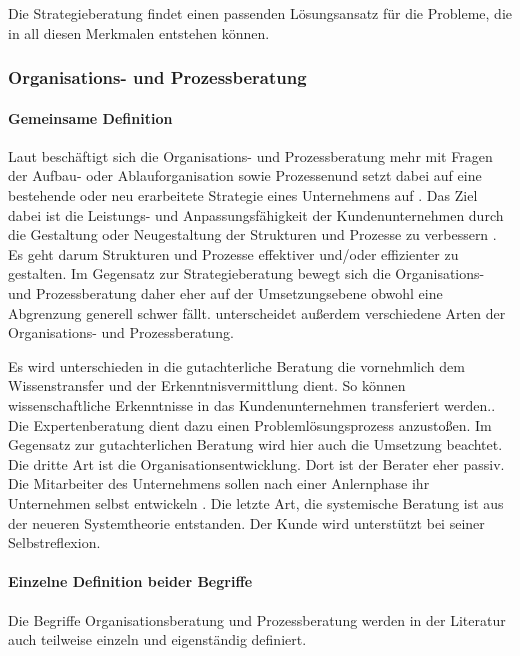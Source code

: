 Die Strategieberatung findet einen passenden Lösungsansatz für die Probleme, die in all diesen Merkmalen entstehen können.


\subsubsection*{Organisations- und Prozessberatung}

\paragraph*{Gemeinsame Definition}
Laut \cite[63]{Lippold201309} beschäftigt sich die Organisations- und Prozessberatung mehr \glqq mit Fragen der Aufbau- oder Ablauforganisation sowie Prozessen\grqq und setzt dabei auf eine \glqq bestehende oder neu erarbeitete Strategie eines Unternehmens auf \grqq. Das Ziel \glqq dabei ist die Leistungs- und Anpassungsfähigkeit der Kundenunternehmen durch die Gestaltung oder Neugestaltung der Strukturen und Prozesse zu verbessern \grqq. Es geht darum Strukturen und Prozesse \glqq effektiver und/oder effizienter \grqq zu gestalten. Im Gegensatz zur Strategieberatung bewegt sich die Organisations- und Prozessberatung daher eher auf der Umsetzungsebene obwohl eine Abgrenzung generell schwer fällt. \cite[63]{Lippold201309} unterscheidet außerdem verschiedene Arten der Organisations- und Prozessberatung.

Es wird unterschieden in die gutachterliche Beratung die \glqq vornehmlich dem Wissenstransfer und der Erkenntnisvermittlung \grqq dient. So können \glqq wissenschaftliche Erkenntnisse in das Kundenunternehmen transferiert werden.\grqq . Die Expertenberatung dient dazu einen \glqq Problemlösungsprozess \grqq anzustoßen. Im Gegensatz zur gutachterlichen Beratung wird hier auch die Umsetzung beachtet. Die dritte Art ist die Organisationsentwicklung. Dort ist der Berater \glqq eher passiv\grqq. 
Die Mitarbeiter des Unternehmens sollen nach einer Anlernphase ihr Unternehmen selbst \glqq entwickeln \grqq . 
Die letzte Art, die systemische Beratung ist aus der neueren Systemtheorie entstanden. Der Kunde wird unterstützt \glqq bei seiner Selbstreflexion\grqq. 

\paragraph*{Einzelne Definition beider Begriffe}
Die Begriffe Organisationsberatung und Prozessberatung werden in der Literatur auch teilweise einzeln und eigenständig definiert.

